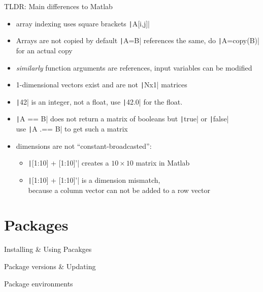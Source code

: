 \documentclass[aspectratio=169, 12pt]{beamer}
\begin{document}
    \begin{frame}[fragile]{TLDR: Main differences to Matlab}
        \begin{itemize}
            \item array indexing uses square brackets \texttt|A[i,j]|
            \item Arrays are not copied by default \texttt|A=B| references the same, do \texttt|A=copy(B)| for an actual copy
            \item \emph{similarly} function arguments are references, \alert{input variables can be modified}
            \item 1-dimensional vectors exist and are not \texttt|Nx1| matrices
            \item \texttt|42| is an integer, not a float, use \texttt|42.0| for the float.
            \item \texttt|A == B| does not return a matrix of booleans but \texttt|true| or \texttt|false|\\
            use \texttt|A .== B| to get such a matrix
            \item dimensions are not “constant-broadcasted”:\\
            \begin{itemize}
                \item \texttt|[1:10] + [1:10]'| creates a $10\times 10$ matrix in Matlab
                \item \texttt|[1:10] + [1:10]'| is a dimension mismatch,\\
                 because a column vector can not be added to a row vector
            \end{itemize}
        \end{itemize}
    \end{frame}
    \section{Packages}
    \begin{frame}{Installing \& Using Pacakges}

    \end{frame}
    \begin{frame}{Package versions \& Updating}

    \end{frame}
    \begin{frame}{Package environments}

    \end{frame}
\end{document}
